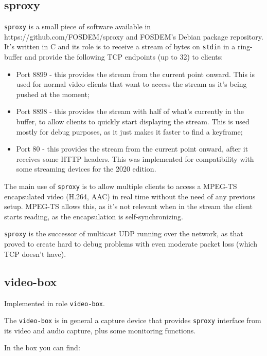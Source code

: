 \documentclass{article}
\begin{document}
\subsection{sproxy}

\texttt{sproxy} is a small piece of software available in https://github.com/FOSDEM/sproxy and FOSDEM's Debian package repository. It's written in C and its role is to receive a stream of bytes on \texttt{stdin} in a ring-buffer and provide the following TCP endpoints (up to 32) to clients:

\begin{itemize}
  \item Port 8899 - this provides the stream from the current point onward. This is used for normal video clients that want to access the stream as it's being pushed at the moment;
  \item Port 8898 - this provides the stream with half of what's currently in the buffer, to allow clients to quickly start displaying the stream. This is used mostly for debug purposes, as it just makes it faster to find a keyframe;
  \item Port 80 - this provides the stream from the current point onward, after it receives some HTTP headers. This was implemented for compatibility with some streaming devices for the 2020 edition.
\end{itemize}

The main use of \texttt{sproxy} is to allow multiple clients to access a
MPEG-TS encapsulated video (H.264, AAC) in real time without the need of any
previous setup. MPEG-TS allows this, as it's not relevant when in the stream
the client starts reading, as the encapsulation is self-synchronizing.

\texttt{sproxy} is the successor of multicast UDP running over the network, as
that proved to create hard to debug problems with even moderate packet loss
(which TCP doesn't have).

\subsection{video-box}

Implemented in role \texttt{video-box}.

The \texttt{video-box} is in general a capture device that provides \texttt{sproxy} interface from its video and audio capture, plus some monitoring functions.

In the box you can find:
\end{document}
